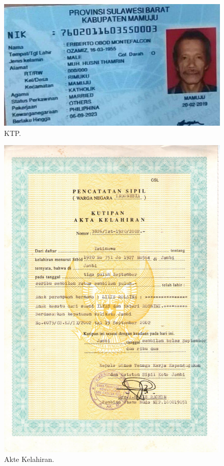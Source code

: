 \begin{figure}[H]
	\centering
	\includegraphics[width=16cm]{figures/ktp.jpg}
	\caption{KTP.}	
\end{figure}
\begin{figure}[H]
	\centering
	\includegraphics[width=16cm]{figures/akte.jpg}
	\caption{Akte Kelahiran.}	
\end{figure}
